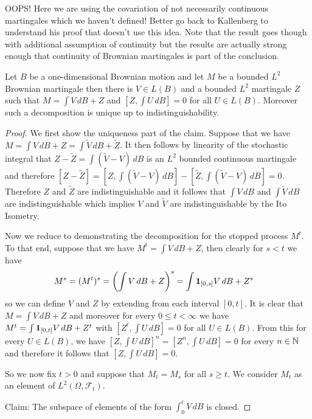 OOPS!  Here we are using the covariation of not necessarily continuous martingales which we haven't defined!  Better go back to Kallenberg to understand his proof that doesn't use this idea.  Note that the result goes though with additional assumption of continuity but the results are actually strong enough that continuity of Brownian martingales is part of the conclusion.
\begin{lem}Let $B$ be a one-dimensional Brownian motion and let $M$ be a bounded $L^2$ Brownian martingale then there is $V \in L(B)$ and a bounded $L^2$ martingale $Z$ such that $M = \int V \, dB + Z$ and $[Z, \int U \, dB] = 0$ for all $U \in L(B)$.  Moreover such a decomposition is unique up to indistinguishability.
\end{lem}
\begin{proof}
We first show the uniqueness part of the claim.  Suppose that we have $M = \int V \, dB + Z = \int \tilde{V} \, dB + \tilde{Z}$.  It then follows by linearity of the stochastic integral that $Z - \tilde{Z} = \int (\tilde{V} - V) \, dB$ is an $L^2$ bounded continuous martingale and therefore $[Z-\tilde{Z}] = [Z, \int (\tilde{V} - V) \,dB] -  [\tilde{Z}, \int (\tilde{V} - V) \,dB] = 0$.  Therefore $Z$ and $\tilde{Z}$ are indistinguishable and it follows that $\int V \, dB$ and $\int \tilde{V} \, dB$ are indistinguishable which implies $V$ and $\tilde{V}$ are indistinguishable by the Ito Isometry.

Now we reduce to demonstrating the decomposition for the stopped process $M^t$.  To that end, suppose that we have $M^t = \int V \, dB + Z$, then clearly for $s < t$ we have 
\begin{align*}
M^s & = (M^t)^s = \left( \int V \, dB + Z \right)^s = \int \textbf{1}_{[0,s]} V \, dB + Z^s
\end{align*}
so we can define $V$ and $Z$ by extending from each interval $[0,t]$.  It is clear that $M = \int V \, dB + Z$ and moreover for every $0 \leq t < \infty$ we have $M^t = \int \textbf{1}_{[0,t]} V \, dB + Z^t$ with $[Z^t, \int U \, dB] = 0$ for all $U \in L(B)$.  From this for every $U \in L(B)$, we have $[Z, \int U \, dB]^n = [Z^n, \int U \, dB] = 0$ for every $n \in \mathbb{N}$ and therefore it follows that $[Z, \int U \, dB] = 0$.

So we now fix $t > 0$ and suppose that $M_t = M_s$ for all $s \geq t$.  We consider $M_t$ as an element of $L^2(\Omega, \mathcal{F}_t)$. 

Claim: The subspace of elements of the form $\int_0^t V \, dB$ is closed.  


\end{proof}
